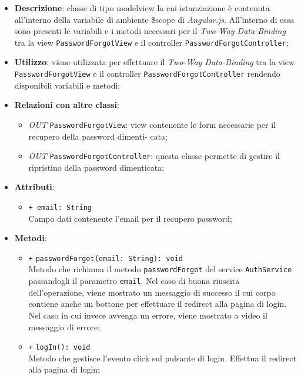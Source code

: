 	\begin{itemize}
		\item \textbf{Descrizione}: classe di tipo modelview la cui istanziazione è contenuta all'interno della variabile di ambiente \$scope di \textit{Angular.js}. All'interno di essa sono presenti le variabili e i metodi necessari per il \textit{Two-Way Data-Binding} tra la view \texttt{PasswordForgotView} e il controller \texttt{PasswordForgotController};
		\item \textbf{Utilizzo}: viene utilizzata per effettuare il \textit{Two-Way Data-Binding} tra la view \texttt{PasswordForgotView} e il controller \texttt{PasswordForgotController} rendendo disponibili variabili e metodi;
		\item \textbf{Relazioni con altre classi}: 
		\begin{itemize}
			\item \textit{OUT} \texttt{PasswordForgotView}: view contenente le form necessarie per il recupero della password dimenti- cata; 
			\item \textit{OUT} \texttt{PasswordForgotController}: questa classe permette di gestire il ripristino della password dimenticata;
		\end{itemize}
		\item \textbf{Attributi}: 
		\begin{itemize}
			\item \texttt{+ email: String} \\ Campo dati contenente l'email per il recupero password;
		\end{itemize}
		\item \textbf{Metodi}: 
		\begin{itemize}
			\item \texttt{+} \texttt{passwordForgot(email: String): void} \\
			Metodo che richiama il metodo \texttt{passwordForgot} del service \texttt{AuthService} passandogli il parametro \texttt{email}. Nel caso di buona riuscita dell'operazione, viene mostrato un messaggio di successo il cui corpo contiene anche un bottone per effettuare il redirect alla pagina di login. Nel caso in cui invece avvenga un errore, viene mostrato a video il messaggio di errore;
			\item \texttt{+} \texttt{logIn(): void} \\
			Metodo che gestisce l’evento click sul pulsante di login. Effettua il redirect alla pagina di login;
		\end{itemize}
	\end{itemize}
	
	